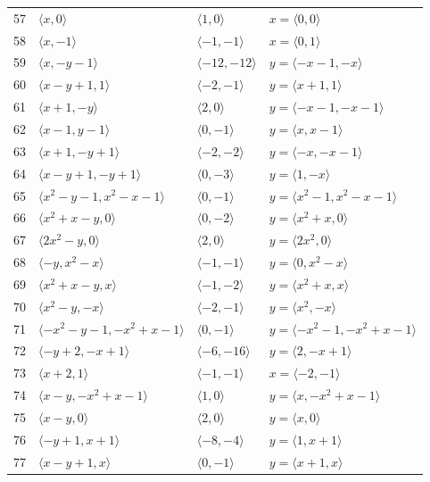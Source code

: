\documentclass[11pt]{article}
\begin{document}
\begin{longtable}{@{}rlll@{}}
57 & $\langle x,0\rangle$ & $\langle 1,0\rangle$ & $x=\langle 0,0\rangle$\\
58 & $\langle x,-1\rangle$ & $\langle -1,-1\rangle$ & $x=\langle 0,1\rangle$\\
59 & $\langle x,-y-1\rangle$ & $\langle -12,-12\rangle$ & $y=\langle -x-1,-x\rangle$\\
60 & $\langle x-y+1,1\rangle$ & $\langle -2,-1\rangle$ & $y=\langle x+1,1\rangle$\\
61 & $\langle x+1,-y\rangle$ & $\langle 2,0\rangle$ & $y=\langle -x-1,-x-1\rangle$\\
62 & $\langle x-1,y-1\rangle$ & $\langle 0,-1\rangle$ & $y=\langle x,x-1\rangle$\\
63 & $\langle x+1,-y+1\rangle$ & $\langle -2,-2\rangle$ & $y=\langle -x,-x-1\rangle$\\
64 & $\langle x-y+1,-y+1\rangle$ & $\langle 0,-3\rangle$ & $y=\langle 1,-x\rangle$\\
65 & $\langle x^{2}-y-1,x^{2}-x-1\rangle$ & $\langle 0,-1\rangle$ & $y=\langle x^{2}-1,x^{2}-x-1\rangle$\\
66 & $\langle x^{2}+x-y,0\rangle$ & $\langle 0,-2\rangle$ & $y=\langle x^{2}+x,0\rangle$\\
67 & $\langle 2x^{2}-y,0\rangle$ & $\langle 2,0\rangle$ & $y=\langle 2x^{2},0\rangle$\\
68 & $\langle -y,x^{2}-x\rangle$ & $\langle -1,-1\rangle$ & $y=\langle 0,x^{2}-x\rangle$\\
69 & $\langle x^{2}+x-y,x\rangle$ & $\langle -1,-2\rangle$ & $y=\langle x^{2}+x,x\rangle$\\
70 & $\langle x^{2}-y,-x\rangle$ & $\langle -2,-1\rangle$ & $y=\langle x^{2},-x\rangle$\\
71 & $\langle -x^{2}-y-1,-x^{2}+x-1\rangle$ & $\langle 0,-1\rangle$ & $y=\langle -x^{2}-1,-x^{2}+x-1\rangle$\\
72 & $\langle -y+2,-x+1\rangle$ & $\langle -6,-16\rangle$ & $y=\langle 2,-x+1\rangle$\\
73 & $\langle x+2,1\rangle$ & $\langle -1,-1\rangle$ & $x=\langle -2,-1\rangle$\\
74 & $\langle x-y,-x^{2}+x-1\rangle$ & $\langle 1,0\rangle$ & $y=\langle x,-x^{2}+x-1\rangle$\\
75 & $\langle x-y,0\rangle$ & $\langle 2,0\rangle$ & $y=\langle x,0\rangle$\\
76 & $\langle -y+1,x+1\rangle$ & $\langle -8,-4\rangle$ & $y=\langle 1,x+1\rangle$\\
77 & $\langle x-y+1,x\rangle$ & $\langle 0,-1\rangle$ & $y=\langle x+1,x\rangle$\\
\end{longtable}
\endgroup
\end{document}
